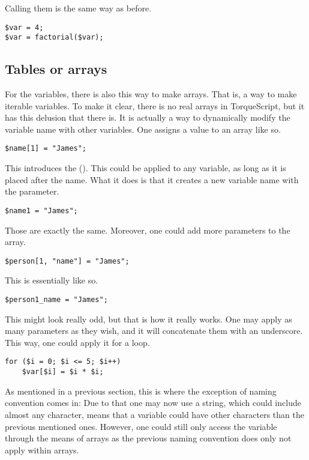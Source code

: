 Calling them is the same way as before.

\begin{lstlisting}[style=ts]
$var = 4;
$var = factorial($var);
\end{lstlisting}

\subsection{Tables or arrays}

For the variables, there is also this way to make arrays. That is, a way to make iterable variables. To make it clear, there is no real arrays in TorqueScript, but it has this delusion that there is. It is actually a way to dynamically modify the variable name with other variables. One assigns a value to an array like so.

\begin{lstlisting}[style=ts]
$name[1] = "James";
\end{lstlisting}

This introduces the  (\code{[]}). This could be applied to any variable, as long as it is placed after the name. What it does is that it creates a new variable name with the parameter.

\begin{lstlisting}[style=ts]
$name1 = "James";
\end{lstlisting}

Those are exactly the same. Moreover, one could add more parameters to the array.

\begin{lstlisting}[style=ts]
$person[1, "name"] = "James";
\end{lstlisting}

This is essentially like so.

\begin{lstlisting}[style=ts]
$person1_name = "James";
\end{lstlisting}

This might look really odd, but that is how it really works. One may apply as many parameters as they wish, and it will concatenate them with an underscore. This way, one could apply it for a loop.

\begin{lstlisting}[style=ts]
for ($i = 0; $i <= 5; $i++)
	$var[$i] = $i * $i;
\end{lstlisting}

As mentioned in a previous section, this is where the exception of naming convention comes in: Due to that one may now use a string, which could include almost any character, means that a variable could have other characters than the previous mentioned ones. However, one could still only access the variable through the means of arrays as the previous naming convention does only not apply within arrays.


